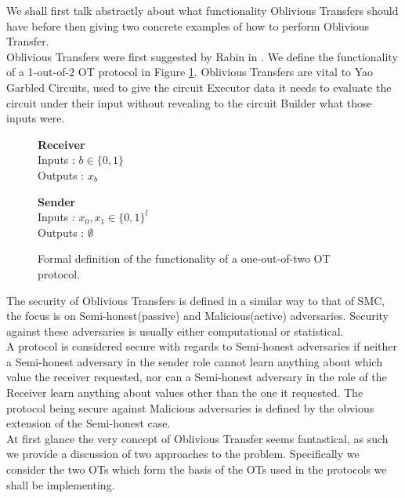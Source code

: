 \documentclass[ %
                    author={Nicholas Tutte},
                supervisor={Prof. Nigel Smart},
                    degree={MEng},
                     title={Secure Two Party Computation},
                  subtitle={A practical comparison of recent protocols},
                      type={Research - GG1K},
                      year={2015} ]{dissertation}
\begin{document}
			We shall first talk abstractly about what functionality Oblivious Transfers should have before then giving two concrete examples of how to perform Oblivious Transfer.\\

			Oblivious Transfers were first suggested by Rabin in \cite{Rabin81}. We define the functionality of a 1-out-of-2 OT protocol in Figure \ref{fig:OTformalDef}. Oblivious Transfers are vital to Yao Garbled Circuits, used to give the circuit Executor data it needs to evaluate the circuit under their input without revealing to the circuit Builder what those inputs were.\\

			\begin{figure}[!htb]
				\centering
				\begin{minipage}{0.45\textwidth}
					\centering
					\textbf{Receiver}\\
					Inputs : $b \in \{0, 1\}$\\
					Outputs : $x_b$\\
				\end{minipage}
				\begin{minipage}{0.45\textwidth}
					\centering
					\textbf{Sender}\\
					Inputs : $x_0, x_1 \in \{0, 1\}^l$\\
					Outputs : $\emptyset$\\
				\end{minipage}

				\caption{ Formal definition of the functionality of a one-out-of-two OT protocol.\label{fig:OTformalDef}}
			\end{figure}

			The security of Oblivious Transfers is defined in a similar way to that of SMC, the focus is on Semi-honest(passive) and Malicious(active) adversaries. Security against these adversaries is usually either computational or statistical.\\

			A protocol is considered secure with regards to Semi-honest adversaries if neither a Semi-honest adversary in the sender role cannot learn anything about which value the receiver requested, nor can a Semi-honest adversary in the role of the Receiver learn anything about values other than the one it requested. The protocol being secure against Malicious adversaries is defined by the obvious extension of the Semi-honest case.\\

			At first glance the very concept of Oblivious Transfer seems fantastical, as such we provide a discussion of two approaches to the problem. Specifically we consider the two OTs which form the basis of the OTs used in the protocols we shall be implementing.\\
\end{document}
